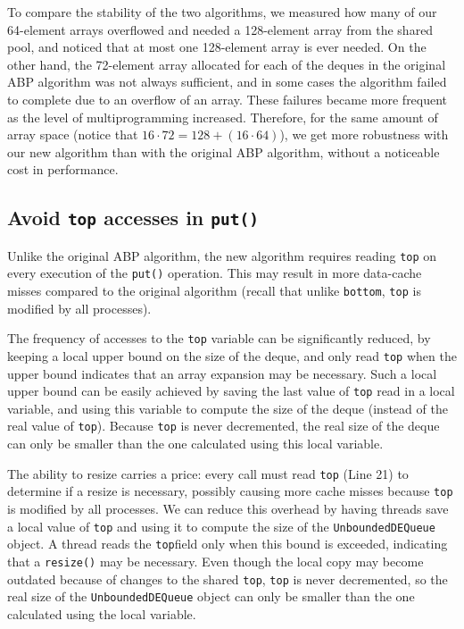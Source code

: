 To compare the stability of the two algorithms, we measured how many
of our 64-element arrays overflowed and needed a 128-element array
from the shared pool, and noticed that at most one 128-element array
is ever needed. On the other hand, the 72-element array allocated for
each of the deques in the original ABP algorithm was not always
sufficient, and in some cases the algorithm failed to complete due to
an overflow of an array. These failures became more frequent as the
level of multiprogramming increased. Therefore, for the same amount of
array space (notice that $16 \cdot 72 = 128 + (16 \cdot 64)$), we get
more robustness with our new algorithm than with the original ABP
algorithm, without a noticeable cost in performance.

\subsection{Avoid \lstinline!top! accesses in \lstinline!put()!}

Unlike the original ABP algorithm, the new algorithm requires reading
\lstinline!top! on every execution of the \lstinline!put()!
operation. This may result in more data-cache misses compared to the
original algorithm (recall that unlike \lstinline!bottom!,
\lstinline!top! is modified by all processes).

The frequency of accesses to the \lstinline!top! variable can be
significantly reduced, by keeping a local upper bound on the size of
the deque, and only read \lstinline!top! when the upper bound
indicates that an array expansion may be necessary. Such a local upper
bound can be easily achieved by saving the last value of
\lstinline!top! read in a local variable, and using this variable to
compute the size of the deque (instead of the real value of
\lstinline!top!). Because \lstinline!top! is never decremented, the
real size of the deque can only be smaller than the one calculated
using this local variable.


The ability to resize carries a price: every call must read
\lstinline!top! (Line 21) to determine if a resize is necessary,
possibly causing more cache misses because \lstinline!top!  is
modified by all processes. We can reduce this overhead by having
threads save a local value of \lstinline!top!  and using it to compute
the size of the \lstinline!UnboundedDEQueue!  object. A thread reads
the \lstinline!top!field only when this bound is exceeded, indicating
that a \lstinline!resize()! may be necessary.  Even though the local
copy may become outdated because of changes to the shared
\lstinline!top!, \lstinline!top! is never decremented, so the real
size of the \lstinline!UnboundedDEQueue! object can only be smaller
than the one calculated using the local variable.

